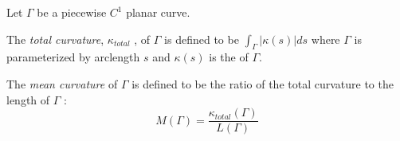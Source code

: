 \documentclass[12pt]{article}
\begin{document}
Let $ \Gamma $ be a piecewise $C^1$ planar curve. 

The \emph{total curvature}, $\kappa_{total}$ ,  of $\Gamma$ is defined to be $\int_{\Gamma} |\kappa(s)| ds $ where $\Gamma$ is parameterized by arclength $s$
and $\kappa(s)$ is the 
of $\Gamma$.

The \emph{mean curvature} of $\Gamma$ is defined to be the ratio of the total curvature to the length of $\Gamma$ : $$ M(\Gamma) = \frac{\kappa_{total} (\Gamma)}{L(\Gamma)}$$
\end{document}
